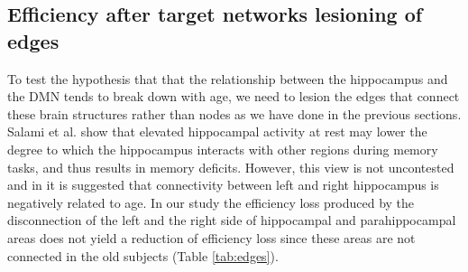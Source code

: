 \documentclass[12pt,a4paper]{article}
\begin{document}
\subsection{Efficiency after target networks lesioning of edges}
\label{ss:edges}
To test the hypothesis that that the relationship between the hippocampus and the DMN tends to break down with age, we need to lesion the edges that connect these brain structures rather than nodes as we have done in the previous sections. 
Salami et al. show that \cite{salami_elevated_2014} elevated hippocampal activity at rest may lower the degree to which the hippocampus interacts with other regions during memory tasks, and thus results in memory deficits. However, this view is not uncontested and in \cite{Damoiseaux_2015} it is suggested that connectivity between left and right hippocampus is negatively related to age.
In our study the efficiency loss produced by the disconnection of the left and the right side of hippocampal and parahippocampal areas does not yield a reduction of efficiency loss since these areas are not connected in the old subjects (Table \ref{tab:edges}). 
\end{document}
